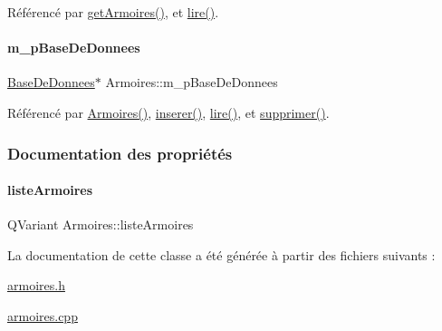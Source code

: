 Référencé par \hyperlink{class_armoires_a4ad204a0768f9aa9cfb400a362ae7b07}{get\+Armoires()}, et \hyperlink{class_armoires_a2b64b3df08cf848d06b4ffb6a49ae858}{lire()}.

\mbox{\label{class_armoires_a096a57892eaad473fefc2a20fe4965bd}} 
\paragraph{\texorpdfstring{m\+\_\+p\+Base\+De\+Donnees}{m\_pBaseDeDonnees}}
{\footnotesize\ttfamily \hyperlink{class_base_de_donnees}{Base\+De\+Donnees}$\ast$ Armoires\+::m\+\_\+p\+Base\+De\+Donnees\hspace{0.3cm}{\ttfamily [private]}}



Référencé par \hyperlink{class_armoires_a0783981e55af5badbcb4b8eb5a52a0eb}{Armoires()}, \hyperlink{class_armoires_a0aa944d8f94667783ea95424e1915aba}{inserer()}, \hyperlink{class_armoires_a2b64b3df08cf848d06b4ffb6a49ae858}{lire()}, et \hyperlink{class_armoires_aa8cb545cec5ebf4603dff93e87662cc9}{supprimer()}.



\subsubsection{Documentation des propriétés}
\mbox{\label{class_armoires_aa17b53e9003fe2285d7e9e0ad6999137}} 
\paragraph{\texorpdfstring{liste\+Armoires}{listeArmoires}}
{\footnotesize\ttfamily Q\+Variant Armoires\+::liste\+Armoires\hspace{0.3cm}{\ttfamily [read]}}



La documentation de cette classe a été générée à partir des fichiers suivants \+:\begin{DoxyCompactItemize}
\item 
\hyperlink{armoires_8h}{armoires.\+h}\item 
\hyperlink{armoires_8cpp}{armoires.\+cpp}\end{DoxyCompactItemize}
